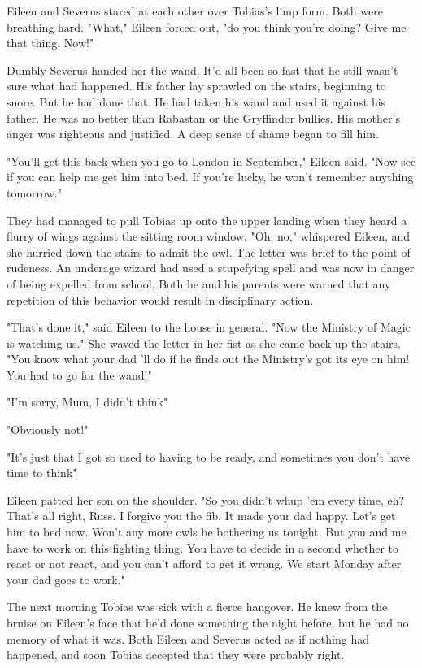 Eileen and Severus stared at each other over Tobias's limp form. Both were breathing hard. "What," Eileen forced out, "do you think you're doing? Give me that thing. Now!"

Dumbly Severus handed her the wand. It'd all been so fast that he still wasn't sure what had happened. His father lay sprawled on the stairs, beginning to snore. But he had done that. He had taken his wand and used it against his father. He was no better than Rabastan or the Gryffindor bullies. His mother's anger was righteous and justified. A deep sense of shame began to fill him.

"You'll get this back when you go to London in September," Eileen said. "Now see if you can help me get him into bed. If you're lucky, he won't remember anything tomorrow."

They had managed to pull Tobias up onto the upper landing when they heard a flurry of wings against the sitting room window. "Oh, no," whispered Eileen, and she hurried down the stairs to admit the owl. The letter was brief to the point of rudeness. An underage wizard had used a stupefying spell and was now in danger of being expelled from school. Both he and his parents were warned that any repetition of this behavior would result in disciplinary action.

"That's done it," said Eileen to the house in general. "Now the Ministry of Magic is watching us." She waved the letter in her fist as she came back up the stairs. "You know what your dad 'll do if he finds out the Ministry's got its eye on him! You had to go for the wand!"

"I'm sorry, Mum, I didn't think{\el}"

"Obviously not!"

"It's just that I got so used to having to be ready, and sometimes you don't have time to think{\el}"

Eileen patted her son on the shoulder. "So you didn't whup 'em every time, eh? That's all right, Russ. I forgive you the fib. It made your dad happy. Let's get him to bed now. Won't any more owls be bothering us tonight. But you and me have to work on this fighting thing. You have to decide in a second whether to react or not react, and you can't afford to get it wrong. We start Monday after your dad goes to work."

The next morning Tobias was sick with a fierce hangover. He knew from the bruise on Eileen's face that he'd done something the night before, but he had no memory of what it was. Both Eileen and Severus acted as if nothing had happened, and soon Tobias accepted that they were probably right.

